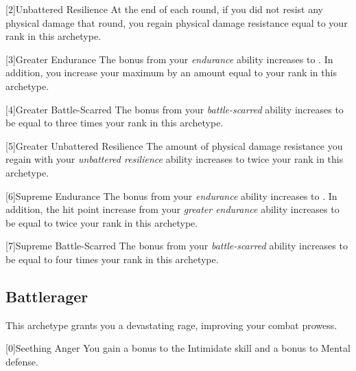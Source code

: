         [2]{Unbattered Resilience} At the end of each round, if you did not resist any physical damage that round, you regain physical damage resistance equal to your rank in this archetype.

        [3]{Greater Endurance} The bonus from your \textit{endurance} ability increases to .
        In addition, you increase your maximum  by an amount equal to your rank in this archetype.

        [4]{Greater Battle-Scarred} The bonus from your \textit{battle-scarred} ability increases to be equal to three times your rank in this archetype.

        [5]{Greater Unbattered Resilience} The amount of physical damage resistance you regain with your \textit{unbattered resilience} ability increases to twice your rank in this archetype.

        [6]{Supreme Endurance} The bonus from your \textit{endurance} ability increases to .
        In addition, the hit point increase from your \textit{greater endurance} ability increases to be equal to twice your rank in this archetype.

        [7]{Supreme Battle-Scarred} The bonus from your \textit{battle-scarred} ability increases to be equal to four times your rank in this archetype.

    \newpage
    \subsection{Battlerager}\label{Rage}
        This archetype grants you a devastating rage, improving your combat prowess.

        [0]{Seething Anger} You gain a  bonus to the Intimidate skill and a  bonus to Mental defense.

